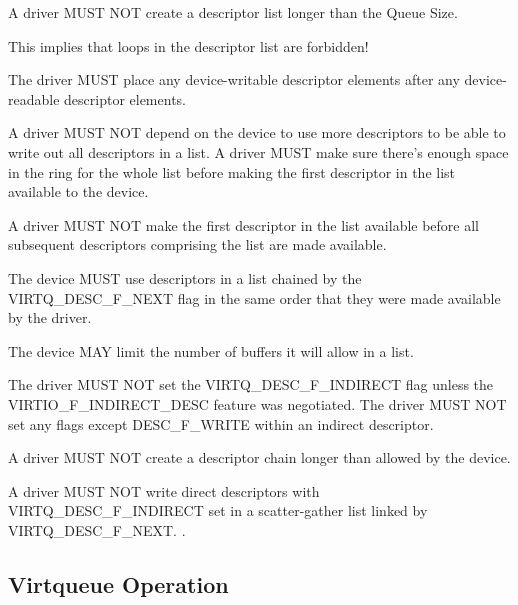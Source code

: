 A driver MUST NOT create a descriptor list longer than the Queue
Size.

This implies that loops in the descriptor list are forbidden!

The driver MUST place any device-writable descriptor elements after
any device-readable descriptor elements.

A driver MUST NOT depend on the device to use more descriptors
to be able to write out all descriptors in a list. A driver
MUST make sure there's enough space in the ring
for the whole list before making the first descriptor in the list
available to the device.

A driver MUST NOT make the first descriptor in the list available
before all subsequent descriptors comprising the list are made
available.

The device MUST use descriptors in a list chained by the
VIRTQ_DESC_F_NEXT flag in the same order that they
were made available by the driver.

The device MAY limit the number of buffers it will allow in a
list.

The driver MUST NOT set the VIRTQ_DESC_F_INDIRECT flag unless the
VIRTIO_F_INDIRECT_DESC feature was negotiated.   The driver MUST NOT
set any flags except DESC_F_WRITE within an indirect descriptor.

A driver MUST NOT create a descriptor chain longer than allowed
by the device.

A driver MUST NOT write direct descriptors with
VIRTQ_DESC_F_INDIRECT set in a scatter-gather list linked by
VIRTQ_DESC_F_NEXT.
.

\subsection{Virtqueue Operation}\label{sec:Basic Facilities of a Virtio Device / Packed Virtqueues / Virtqueue Operation}

